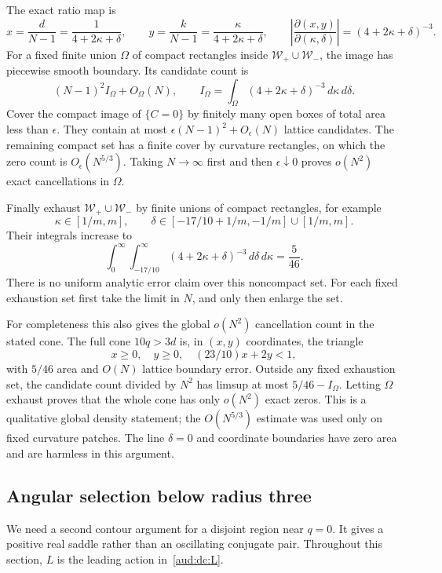 \documentclass[11pt,a4paper]{article}
\numberwithin{equation}{section}
\begin{document}
The exact ratio map is
\begin{equation}\label{aud:gh:Jacobian}
 x=\frac d{N-1}=\frac1{4+2\kappa+\delta},\qquad
 y=\frac k{N-1}=\frac\kappa{4+2\kappa+\delta},\qquad
 \left|\frac{\partial(x,y)}{\partial(\kappa,\delta)}\right|
 =(4+2\kappa+\delta)^{-3}.
\end{equation}
For a fixed finite union $\Omega$ of compact rectangles inside $\mathcal W_+\cup\mathcal W_-$, the image has piecewise smooth boundary. Its candidate count is
\begin{equation}\label{aud:gh:compactcount}
 (N-1)^2I_\Omega+O_\Omega(N),\qquad
 I_\Omega=\int_\Omega(4+2\kappa+\delta)^{-3}\,d\kappa\,d\delta.
\end{equation}
Cover the compact image of $\{C=0\}$ by finitely many open boxes of total area less than $\epsilon$. They contain at most $\epsilon(N-1)^2+O_\epsilon(N)$ lattice candidates. The remaining compact set has a finite cover by curvature rectangles, on which the zero count is $O_\epsilon(N^{5/3})$. Taking $N\to\infty$ first and then $\epsilon\downarrow0$ proves $o(N^2)$ exact cancellations in $\Omega$.

Finally exhaust $\mathcal W_+\cup\mathcal W_-$ by finite unions of compact rectangles, for example
\[
 \kappa\in[1/m,m],\qquad
 \delta\in[-17/10+1/m,-1/m]\cup[1/m,m].
\]
Their integrals increase to
\begin{equation}\label{aud:gh:widearea}
 \int_0^\infty\int_{-17/10}^\infty
       (4+2\kappa+\delta)^{-3}\,d\delta\,d\kappa=\frac5{46}.
\end{equation}
There is no uniform analytic error claim over this noncompact set. For each fixed exhaustion set first take the limit in $N$, and only then enlarge the set.

For completeness this also gives the global $o(N^2)$ cancellation count in the stated cone. The full cone $10q>3d$ is, in $(x,y)$ coordinates, the triangle
\[
 x\ge0,\quad y\ge0,\quad (23/10)x+2y<1,
\]
with $5/46$ area and $O(N)$ lattice boundary error. Outside any fixed exhaustion set, the candidate count divided by $N^2$ has limsup at most $5/46-I_\Omega$. Letting $\Omega$ exhaust proves that the whole cone has only $o(N^2)$ exact zeros. This is a qualitative global density statement; the $O(N^{5/3})$ estimate was used only on fixed curvature patches. The line $\delta=0$ and coordinate boundaries have zero area and are harmless in this argument.
\subsection{Angular selection below radius three}\label{aud:gh:angularsection}
We need a second contour argument for a disjoint region near $q=0$.
It gives a positive real saddle rather than an oscillating conjugate pair.
Throughout this section, $L$ is the leading action in~\eqref{aud:dc:L}.
\end{document}
